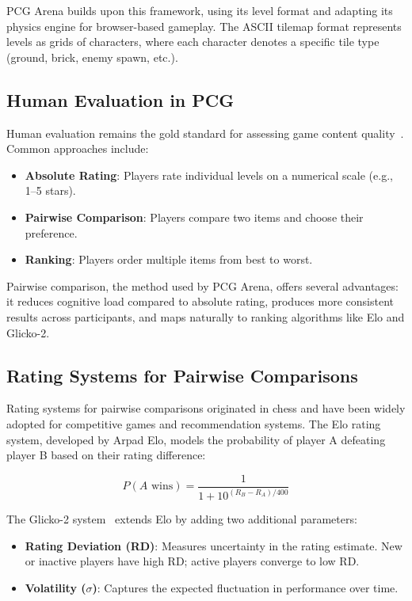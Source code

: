 \documentclass[11pt,a4paper]{article}
\theoremstyle{plain}
\theoremstyle{definition}
\theoremstyle{remark}
\begin{document}
PCG Arena builds upon this framework, using its level format and adapting its physics engine for browser-based gameplay. The ASCII tilemap format represents levels as grids of characters, where each character denotes a specific tile type (ground, brick, enemy spawn, etc.).

\subsection{Human Evaluation in PCG}
\label{subsec:human-eval}

Human evaluation remains the gold standard for assessing game content quality~\cite{marioai}. Common approaches include:

\begin{itemize}
    \item \textbf{Absolute Rating}: Players rate individual levels on a numerical scale (e.g., 1--5 stars).
    \item \textbf{Pairwise Comparison}: Players compare two items and choose their preference.
    \item \textbf{Ranking}: Players order multiple items from best to worst.
\end{itemize}

Pairwise comparison, the method used by PCG Arena, offers several advantages: it reduces cognitive load compared to absolute rating, produces more consistent results across participants, and maps naturally to ranking algorithms like Elo and Glicko-2.

\subsection{Rating Systems for Pairwise Comparisons}
\label{subsec:rating-systems}

Rating systems for pairwise comparisons originated in chess and have been widely adopted for competitive games and recommendation systems. The Elo rating system, developed by Arpad Elo, models the probability of player A defeating player B based on their rating difference:

\begin{equation}
P(A \text{ wins}) = \frac{1}{1 + 10^{(R_B - R_A)/400}}
\end{equation}

The Glicko-2 system~\cite{glickman2012} extends Elo by adding two additional parameters:

\begin{itemize}
    \item \textbf{Rating Deviation (RD)}: Measures uncertainty in the rating estimate. New or inactive players have high RD; active players converge to low RD.
    \item \textbf{Volatility ($\sigma$)}: Captures the expected fluctuation in performance over time.
\end{itemize}
\end{document}
